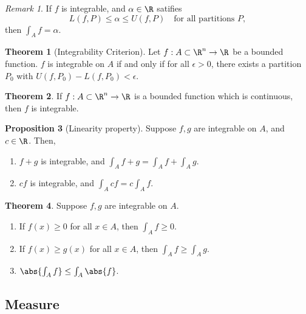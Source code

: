 \documentclass[a5paper]{article}
\theoremstyle{definition}%
\newtheorem{theorem}{Theorem}
\newtheorem{proposition}[theorem]{Proposition}
\numberwithin{exercise}{section}
\theoremstyle{remark}%
\newtheorem*{remark*}{Remark}
\begin{document}
\begin{remark*}
If $f$ is integrable, and $\alpha\in\R$ satifies 
$$L(f,P)\leq\alpha\leq U(f,P)\quad \text{for all partitions } P,$$
then $\int_A f=\alpha$. 
\end{remark*}

\begin{highlight}
\begin{theorem}[Integrability Criterion]
Let $f:A\subset \R^n\to\R$ be a bounded function. $f$ is integrable on $A$ if and only if for all $\epsilon>0$, there exists a partition $P_0$ with $U(f,P_0)-L(f,P_0)<\epsilon$. 
\end{theorem}
\end{highlight}

\begin{highlight}
\begin{theorem}
If $f:A\subset \R^n\to\R$ is a bounded function which is continuous, then $f$ is integrable. 
\end{theorem}
\end{highlight}

\begin{highlight}
\begin{proposition}[Linearity property]
Suppose $f,g$ are integrable on $A$, and $c\in\R$. Then, 
\begin{enumerate}
\item $f+g$ is integrable, and $\int_A f+g = \int_A f+\int_A g$. 
\item $cf$ is integrable, and $\int_A cf = c\int_A f$. 
\end{enumerate}
\end{proposition}
\end{highlight}

\begin{highlight}
\begin{theorem}
Suppose $f,g$ are integrable on $A$. 
\begin{enumerate}
\item If $f(x)\geq 0$ for all $x\in A$, then $\int_A f \geq 0$. 
\item If $f(x)\geq g(x)$ for all $x\in A$, then $\int_A f \geq \int_A g$. 
\item $\abs{\int_A f} \leq \int_A\abs{f}$. 

\end{enumerate}
\end{theorem}
\end{highlight}

\pagebreak
\subsection{Measure}
\end{document}
